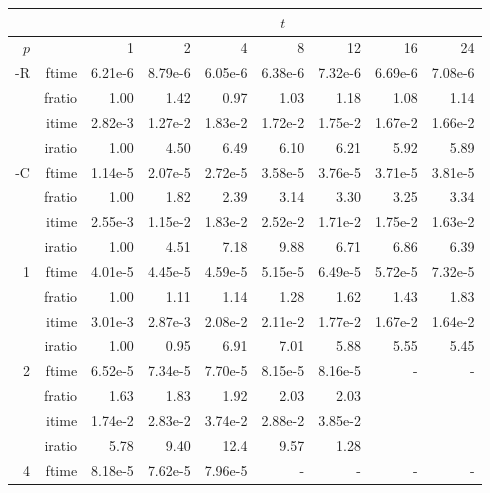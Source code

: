\documentclass[a4]{article}
\begin{document}
\begin{table}
\begin{center}
\begin{tabular}{|r|r|r|r|r|r|r|r|r|}
\hline 
     &  & \multicolumn{7}{c|}{$t$} \\ \hline
    $p$  &  & 1           & 2    & 4    & 8    & 12   & 16    & 24  \\ \hline\hline
    -R  & ftime &  6.21e-6 &   8.79e-6 &   6.05e-6 &   6.38e-6 &   7.32e-6 &   6.69e-6 &   7.08e-6    \\ 
      & fratio &   1.00 &   1.42 &   0.97 &   1.03 &   1.18 &   1.08 &   1.14    \\ 
     & itime &      2.82e-3 &   1.27e-2 &   1.83e-2 &   1.72e-2 &   1.75e-2 &   1.67e-2 &   1.66e-2  \\ 
     & iratio &    1.00 &   4.50 &   6.49 &   6.10 &   6.21 &   5.92 &   5.89    \\ \hline
    -C  & ftime &  1.14e-5 &   2.07e-5 &   2.72e-5 &   3.58e-5 &   3.76e-5 &   3.71e-5 &   3.81e-5   \\ 
      & fratio &   1.00 &   1.82 &   2.39 &   3.14 &   3.30 &   3.25 &   3.34  \\ 
     & itime &   2.55e-3 &   1.15e-2 &   1.83e-2 &   2.52e-2 &   1.71e-2 &   1.75e-2 &   1.63e-2    \\ 
     & iratio &    1.00 &   4.51 &   7.18 &   9.88 &   6.71 &   6.86 &   6.39     \\ \hline \hline
    1  & ftime &  4.01e-5 &   4.45e-5 &   4.59e-5 &   5.15e-5 &   6.49e-5 &   5.72e-5 &   7.32e-5    \\ 
      & fratio &  1.00 &   1.11 &   1.14 &   1.28 &   1.62 &   1.43 &   1.83    \\ 
     & itime &     3.01e-3 &   2.87e-3 &   2.08e-2 &   2.11e-2 &   1.77e-2 &   1.67e-2 &   1.64e-2   \\ 
     & iratio & 1.00 &   0.95 &   6.91 &   7.01 &   5.88 &   5.55 &   5.45   \\ \hline
    2  & ftime &   6.52e-5 &   7.34e-5 &   7.70e-5 &   8.15e-5 &   8.16e-5 &    - & - \\ 
      & fratio &      1.63 &   1.83 &   1.92 &   2.03 &   2.03 &    &  \\
      & itime &    1.74e-2 &   2.83e-2 &   3.74e-2 &   2.88e-2 &   3.85e-2    & &  \\
      & iratio &   5.78 &   9.40 &   12.4 &   9.57 &   1.28 &   &  \\ \hline
    4  & ftime &   8.18e-5 &   7.62e-5 &   7.96e-5 &   - & - & - & - \\ 

\end{tabular}
\end{center}
\end{table}
\end{document}
